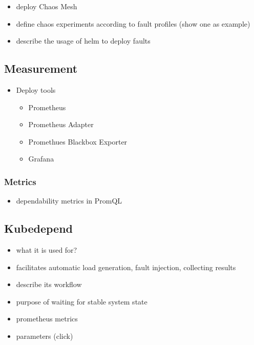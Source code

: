 \begin{itemize}
	\item deploy Chaos Mesh
	\item define chaos experiments according to fault profiles (show one as example)
	\item describe the usage of helm to deploy faults
\end{itemize}

\subsection{Measurement}

\begin{itemize}
	\item Deploy tools \begin{itemize}
		\item Prometheus
		\item Prometheus Adapter
		\item Promethues Blackbox Exporter
		\item Grafana
	\end{itemize}
\end{itemize}

\subsubsection{Metrics}

\begin{itemize}
	
	\item dependability metrics in PromQL
\end{itemize}







\subsection{Kubedepend}

\begin{itemize}
	\item what it is used for?
	\item facilitates automatic load generation, fault injection, collecting results
	\item describe its workflow
	\item purpose of waiting for stable system state
	\item prometheus metrics
	\item parameters (click)
\end{itemize}

